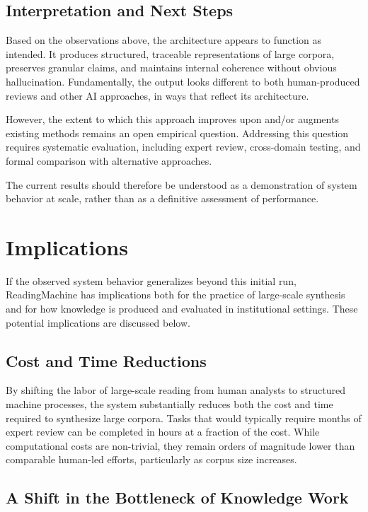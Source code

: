 \documentclass[
  11pt,
]{article}
\begin{document}
\subsection{Interpretation and Next Steps}\label{interpretation-and-next-steps}

Based on the observations above, the architecture appears to function as
intended. It produces structured, traceable representations of large
corpora, preserves granular claims, and maintains internal coherence
without obvious hallucination. Fundamentally, the output looks different
to both human-produced reviews and other AI approaches, in ways that
reflect its architecture.

However, the extent to which this approach improves upon and/or augments
existing methods remains an open empirical question. Addressing this
question requires systematic evaluation, including expert review,
cross-domain testing, and formal comparison with alternative approaches.

The current results should therefore be understood as a demonstration of
system behavior at scale, rather than as a definitive assessment of
performance.

\section{Implications}\label{implications}

If the observed system behavior generalizes beyond this initial run,
ReadingMachine has implications both for the practice of large-scale
synthesis and for how knowledge is produced and evaluated in
institutional settings. These potential implications are discussed
below.

\subsection{Cost and Time
Reductions}\label{cost-and-time-reductions}

By shifting the labor of large-scale reading from human analysts to
structured machine processes, the system substantially reduces both the
cost and time required to synthesize large corpora. Tasks that would
typically require months of expert review can be completed in hours at a
fraction of the cost. While computational costs are non-trivial, they
remain orders of magnitude lower than comparable human-led efforts,
particularly as corpus size increases.

\subsection{A Shift in the Bottleneck of Knowledge
Work}\label{a-shift-in-the-bottleneck-of-knowledge-work}
\end{document}
